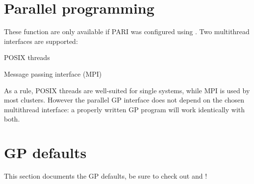 
\section{Parallel programming}

These function are only available if PARI was configured using . Two multithread interfaces are supported:

\item POSIX threads

\item Message passing interface (MPI)

As a rule, POSIX threads are well-suited for single systems, while MPI is used
by most clusters. However the parallel GP interface does not depend on the
chosen multithread interface: a properly written GP program will work
identically with both.


\section{GP defaults}
\label{se:gp_defaults} This section documents the GP defaults, be sure to
check out  and  !


\vfill\eject
